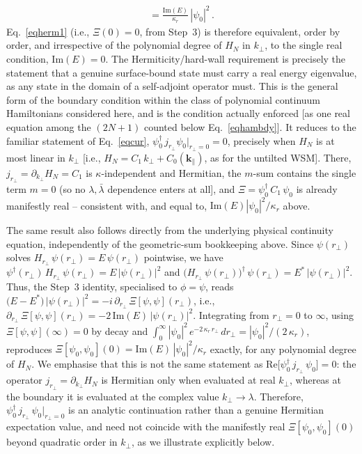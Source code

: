 \documentclass[aps,prb,onecolumn, footinbib, 10pt]{revtex4-2}
\begin{document}
{{\begin{itemize}
\begin{align}
=\frac{\mathrm{Im}(E)}{\kappa_r}\,|\psi_0|^2\,.
\end{align}
Eq.~\eqref{eqherm1} (i.e., $\Xi(0)=0$, from Step~3) is therefore equivalent, order by order, and irrespective of the polynomial degree of $H_N$ in $k_\perp$, to the single real condition, $\mathrm{Im}(E)=0$. The Hermiticity/hard-wall requirement is precisely the statement that a genuine surface-bound state must carry a real energy eigenvalue, as any state in the domain of a self-adjoint operator must. This is the general form of the boundary condition within the class of polynomial continuum Hamiltonians considered here, and is the condition actually enforced [as one real equation among the $(2N+1)$ counted below Eq.~\eqref{eqhambdy}]. It reduces to the familiar statement of Eq.~\eqref{eqcur}, $\psi_0^\dagger \, j_{r_\perp}  \psi_0 \big \vert_{r_\perp=0}=0$, precisely when $H_N$ is at most linear in $k_\perp$ [i.e., $H_N=C_1 \,k_\perp+C_0(\boldsymbol k_\parallel)$, as for the untilted WSM]. There, $j_{r_\perp}=\partial_{k_\perp}H_N=C_1$ is $\kappa$-independent and Hermitian, the $m$-sum contains the single term $m=0$ (so no $\lambda,\bar\lambda$ dependence enters at all], and $\Xi=\psi_0^\dagger \, C_1  \,  \psi_0$ is already manifestly real -- consistent with, and equal to, $\mathrm{Im}(E)|\psi_0|^2/\kappa_r$ above.

The same result also follows directly from the underlying physical continuity equation, independently of the geometric-sum bookkeeping above. Since $\psi(r_\perp)$ solves $H_{r_\perp} \, \psi(r_\perp) = E \, \psi(r_\perp)$ pointwise, we have $\psi^\dagger(r_\perp) \, H_{r_\perp} \, \psi(r_\perp) = E \, |\psi(r_\perp)|^2$ and $\big(H_{r_\perp} \, \psi(r_\perp)\big)^\dagger \, \psi(r_\perp) = E^* \, |\psi(r_\perp)|^2$. Thus, the Step~3 identity, specialised to $\phi=\psi$, reads $\big(E-E^*\big) \, |\psi(r_\perp)|^2 = -i \, \partial_{r_\perp} \, \Xi[\psi,\psi](r_\perp)$, i.e., $\partial_{r_\perp} \, \Xi[\psi,\psi](r_\perp) = -2 \, \mathrm{Im}(E) \, |\psi(r_\perp)|^2$. Integrating from $r_\perp=0$ to $\infty$, using $\Xi[\psi,\psi](\infty)=0$ by decay and $\int_0^\infty |\psi_0|^2 \, e^{-2 \, \kappa_r \, r_\perp} \, dr_\perp = |\psi_0|^2/(2 \, \kappa_r)$, reproduces $\Xi[\psi_0,\psi_0](0) = \mathrm{Im}(E) \, |\psi_0|^2/\kappa_r$ exactly, for any polynomial degree of $H_N$. We emphasise that this is not the same statement as $\mathrm{Re}\big[\psi_0^\dagger \, j_{r_\perp} \, \psi_0\big]=0$: the operator $j_{r_\perp} = \partial_{k_\perp} H_N$ is Hermitian only when evaluated at real $k_\perp$, whereas at the boundary it is evaluated at the complex value $k_\perp\to\lambda$. Therefore, $\psi_0^\dagger \, j_{r_\perp} \, \psi_0\big\vert_{r_\perp=0}$ is an analytic continuation rather than a genuine Hermitian expectation value, and need not coincide with the manifestly real $\Xi[\psi_0,\psi_0](0)$ beyond quadratic order in $k_\perp$, as we illustrate explicitly below.


\end{itemize}}}
\end{document}
